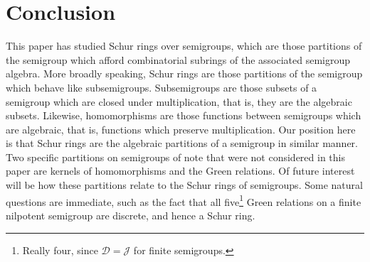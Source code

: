 \documentclass{article}
\theoremstyle{plain}
\theoremstyle{definition}
\begin{document}

\section{Conclusion}\label{sec:questions}
This paper has studied Schur rings over semigroups, which are those partitions of the semigroup which afford combinatorial subrings of the associated semigroup algebra. More broadly speaking, Schur rings are those partitions of the semigroup which behave like subsemigroups. Subsemigroups are those subsets of a semigroup which are closed under multiplication, that is, they are the algebraic subsets. Likewise, homomorphisms are those functions between semigroups which are algebraic, that is, functions which preserve multiplication. Our position here is that Schur rings are the algebraic partitions of a semigroup in similar manner. Two specific partitions on semigroups of note that were not considered in this paper are kernels of homomorphisms and the Green relations. Of future interest will be how these partitions relate to the Schur rings of semigroups. Some natural questions are immediate, such as the fact that all five\footnote{Really four, since $\mathcal{D}=\mathcal{J}$ for finite semigroups.} Green relations on a finite nilpotent semigroup are discrete, and hence a Schur ring.
\end{document}
